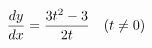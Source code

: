 \documentclass[preview]{standalone}
\begin{document}
\begin{align*}
\special{dvisvgm:raw <g id='unique000'>}\frac{dy}{dx}=\frac{3t^2-3}{2t}\quad(t\ne0)\special{dvisvgm:raw </g>}
\end{align*}
\end{document}
